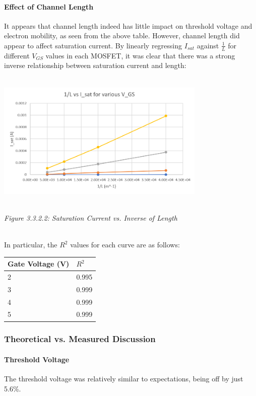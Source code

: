 \documentclass[12pt]{article}
\begin{document}
\paragraph{Effect of Channel Length}
It appears that channel length indeed has little impact on threshold voltage and electron mobility, as seen from the above table. However, channel length did appear to affect saturation current. By linearly regressing $I_{sat}$ against $\frac{1}{L}$ for different $V_{GS}$ values in each MOSFET, it was clear that there was a strong inverse relationship between saturation current and length:
\\
\\\centerline{\includegraphics[width=10cm] {Linear Regression.PNG}}
\begin{center}
\\\emph{Figure 3.3.2.2: Saturation Current vs. Inverse of Length}
\end{center}
\\
In particular, the $R^2$ values for each curve are as follows:
\begin{center}
\begin{tabular}{|l|l|}
\hline
Gate Voltage (V) & $R^2$ \\ \hline
2                & 0.995           \\ \hline
3                & 0.999           \\ \hline
4                & 0.999           \\ \hline
5                & 0.999           \\ \hline
\end{tabular}
\end{center}


\subsubsection{Theoretical vs. Measured Discussion}
\paragraph{Threshold Voltage}
The threshold voltage was relatively similar to expectations, being off by just 5.6\%.
\end{document}
